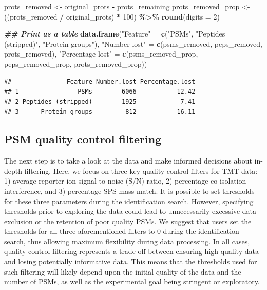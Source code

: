 \documentclass[9pt,a4paper,]{extarticle}
\newenvironment{Shaded}{\begin{snugshade}}{\end{snugshade}}
\newcommand{\AttributeTok}[1]{\textcolor[rgb]{0.13,0.29,0.53}{#1}}
\newcommand{\DecValTok}[1]{\textcolor[rgb]{0.00,0.00,0.81}{#1}}
\newcommand{\DocumentationTok}[1]{\textcolor[rgb]{0.56,0.35,0.01}{\textbf{\textit{#1}}}}
\newcommand{\FunctionTok}[1]{\textcolor[rgb]{0.13,0.29,0.53}{\textbf{#1}}}
\newcommand{\NormalTok}[1]{#1}
\newcommand{\OtherTok}[1]{\textcolor[rgb]{0.56,0.35,0.01}{#1}}
\newcommand{\SpecialCharTok}[1]{\textcolor[rgb]{0.81,0.36,0.00}{\textbf{#1}}}
\newcommand{\StringTok}[1]{\textcolor[rgb]{0.31,0.60,0.02}{#1}}
\begin{document}
\begin{Shaded}
\begin{Highlighting}[]
\NormalTok{prots\_removed }\OtherTok{\textless{}{-}}\NormalTok{ original\_prots }\SpecialCharTok{{-}}\NormalTok{ prots\_remaining}
\NormalTok{prots\_removed\_prop }\OtherTok{\textless{}{-}}\NormalTok{ ((prots\_removed }\SpecialCharTok{/}\NormalTok{ original\_prots) }\SpecialCharTok{*} \DecValTok{100}\NormalTok{) }\SpecialCharTok{\%\textgreater{}\%}
  \FunctionTok{round}\NormalTok{(}\AttributeTok{digits =} \DecValTok{2}\NormalTok{)}
\end{Highlighting}
\end{Shaded}

\begin{Shaded}
\begin{Highlighting}[]
\DocumentationTok{\#\# Print as a table}
\FunctionTok{data.frame}\NormalTok{(}\StringTok{"Feature"} \OtherTok{=} \FunctionTok{c}\NormalTok{(}\StringTok{"PSMs"}\NormalTok{,}
                         \StringTok{"Peptides (stripped)"}\NormalTok{,}
                         \StringTok{"Protein groups"}\NormalTok{),}
           \StringTok{"Number lost"} \OtherTok{=} \FunctionTok{c}\NormalTok{(psms\_removed,}
\NormalTok{                             peps\_removed,}
\NormalTok{                             prots\_removed),}
           \StringTok{"Percentage lost"} \OtherTok{=} \FunctionTok{c}\NormalTok{(psms\_removed\_prop,}
\NormalTok{                                 peps\_removed\_prop,}
\NormalTok{                                 prots\_removed\_prop))}
\end{Highlighting}
\end{Shaded}

\begin{verbatim}
##               Feature Number.lost Percentage.lost
## 1                PSMs        6066           12.42
## 2 Peptides (stripped)        1925            7.41
## 3      Protein groups         812           16.11
\end{verbatim}

\subsection{PSM quality control filtering}\label{psm-quality-control-filtering}

The next step is to take a look at the data and make informed decisions about
in-depth filtering. Here, we focus on three key quality control filters for TMT
data: 1) average reporter ion signal-to-noise (S/N) ratio, 2) percentage
co-isolation interference, and 3) percentage SPS mass match. It is possible to
set thresholds for these three parameters during the identification search.
However, specifying thresholds prior to exploring the data could lead to
unnecessarily excessive data exclusion or the retention of poor quality PSMs. We
suggest that users set the thresholds for all three aforementioned filters to 0
during the identification search, thus allowing maximum flexibility during data
processing. In all cases, quality control filtering represents a trade-off
between ensuring high quality data and losing potentially informative data. This
means that the thresholds used for such filtering will likely depend upon the
initial quality of the data and the number of PSMs, as well as the experimental
goal being stringent or exploratory.
\end{document}

